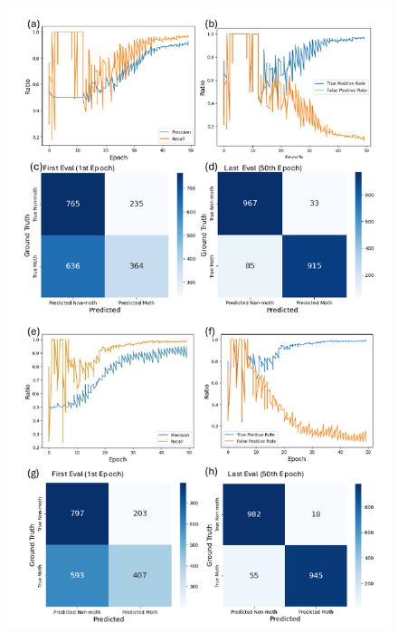 \documentclass[twocolumn]{article}
\begin{document}
\newpage 
\begin{figure}[h]
    \includegraphics[width=16cm, height=26cm]{imgs/train_summary_crop.pdf}
\end{figure} 
\end{document}
